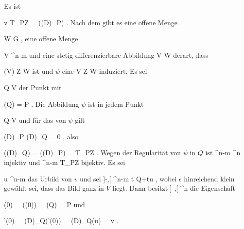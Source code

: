 

Es ist

\mavergleichskettedisp
{\vergleichskette
{ v
}
{ \in }{ T_PZ
}
{ = }{  \left((D\varphi)_P\right)
}
{ } {
}
{ } {
}
}
{}{}{.}
Nach dem
gibt es eine offene Menge

 {}
 {W \subseteq G} {}
 {} {} {} {,}
eine offene Menge

\mavergleichskette
{\vergleichskette
{ V
}
{ \subseteq }{ \R^{n-m}
}
{ } {
}
{ } {
}
{ } {
}
}
{}{}{}
und eine stetig differenzierbare Abbildung
\maabbdisp {\psi} { V } { W } {}
derart, dass

\mavergleichskette
{\vergleichskette
{ \psi(V)
}
{ \subseteq }{ Z \cap W
}
{ } {
}
{ } {
}
{ } {
}
}
{}{}{}
ist und $\psi$ eine
\maabbdisp {\psi} { V } { Z \cap W } {}
induziert. Es sei

\mavergleichskette
{\vergleichskette
{ Q
}
{ \in }{ V
}
{ } {
}
{ } {
}
{ } {
}
}
{}{}{}
der Punkt mit

\mavergleichskettedisp
{\vergleichskette
{ \psi(Q)
}
{ =} { P
}
{ } {
}
{ } {
}
{ } {
}
}
{}{}{.}
Die Abbildung $\psi$ ist in jedem Punkt

\mavergleichskette
{\vergleichskette
{ Q
}
{ \in }{ V
}
{ } {
}
{ } {
}
{ } {
}
}
{}{}{}
und für das
von $\psi$ gilt

\mavergleichskettedisp
{\vergleichskette
{ (D\varphi)_P \circ (D\psi)_Q
}
{ =} { 0
}
{ } {
}
{ } {
}
{ } {
}
}
{}{}{,}
also

\mavergleichskettedisp
{\vergleichskette
{  \left((D\psi)_Q\right)
}
{ =} {  \left((D\varphi)_P\right)
}
{ =} { T_PZ
}
{ } {
}
{ } {
}
}
{}{}{.}
Wegen der Regularität von $\psi$ in $Q$ ist
 { \R^{n-m} } { \R^n } {}
injektiv und
 { \R^{n-m} } { T_PZ } {}
bijektiv. Es sei

\mavergleichskette
{\vergleichskette
{ u
}
{ \in }{ \R^{n-m}
}
{ } {
}
{ } {
}
{ } {
}
}
{}{}{}
das Urbild von $v$ und sei
\maabbeledisp {\theta} { ]-\epsilon,\epsilon[ } { \R^{n-m} } {t} {Q+tu} {,}
wobei $\epsilon$ hinreichend klein gewählt sei, dass das Bild ganz in $V$ liegt. Dann besitzt
\maabbdisp {\gamma=\psi\circ\theta} { ]-\epsilon,\epsilon[ } { \R^n } {}
die Eigenschaft

\mavergleichskettedisp
{\vergleichskette
{ \gamma(0)
}
{ =} { \psi(\theta(0))
}
{ =} { \psi(Q)
}
{ =} { P
}
{ } {
}
}
{}{}{}
und

\mavergleichskettedisp
{\vergleichskette
{ \gamma'(0)
}
{ =} { (D\psi)_Q(\theta'(0))
}
{ =} { (D\psi)_Q(u)
}
{ =} { v
}
{ } {
}
}
{}{}{.}
